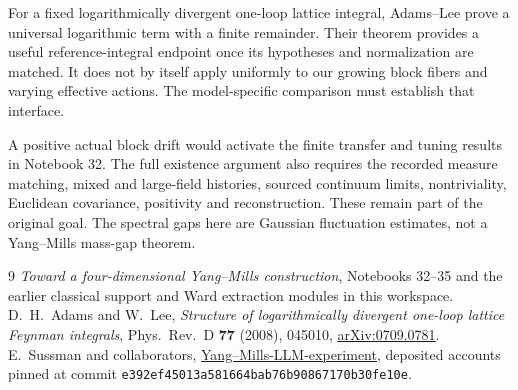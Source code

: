 \documentclass[11pt]{article}
\theoremstyle{remark}
\begin{document}
For a fixed logarithmically divergent one-loop lattice integral,
Adams--Lee prove a universal logarithmic term with a finite remainder.
Their theorem provides a useful reference-integral endpoint once
its hypotheses and normalization are matched. It does not by itself
apply uniformly to our growing block fibers and varying effective
actions. The model-specific comparison must establish that interface.

A positive actual block drift would activate the finite transfer
and tuning results in Notebook 32. The full existence argument also
requires the recorded measure matching, mixed and large-field
histories, sourced continuum limits, nontriviality, Euclidean
covariance, positivity and reconstruction. These remain part of the
original goal. The spectral gaps here are Gaussian fluctuation
estimates, not a Yang--Mills mass-gap theorem.

\begin{thebibliography}{9}
\emph{Toward a four-dimensional Yang--Mills construction},
Notebooks 32--35 and the earlier classical support and Ward
extraction modules in this workspace.
D.~H.~Adams and W.~Lee,
\emph{Structure of logarithmically divergent one-loop lattice
Feynman integrals}, Phys.\ Rev.\ D \textbf{77} (2008), 045010,
\href{https://arxiv.org/abs/0709.0781}{arXiv:0709.0781}.
E.~Sussman and collaborators,
\href{https://github.com/ethanwsussman/Yang--Mills-LLM-experiment}
{Yang--Mills-LLM-experiment}, deposited accounts pinned at
commit \texttt{e392ef45013a581664bab76b90867170b30fe10e}.
\end{thebibliography}
\end{document}
